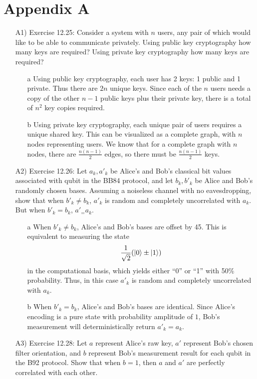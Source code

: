 \documentclass[conference]{IEEEtran}
\begin{document}
\section{Appendix A}
\begin{itemize}
\item [A1)] Exercise 12.25: Consider a system with $n$ users, any pair of which would like to be able to communicate privately. Using public key cryptography how many keys are required? Using private key cryptography how many keys are required?
  \begin{itemize}
  \item [a] Using public key cryptography, each user has 2 keys: 1 public and 1 private. Thus there are $2n$ unique keys. Since each of the $n$ users needs a copy of the other $n-1$ public keys plus their private key, there is a total of $n^2$ key copies required.
  \item [b] Using private key cryptography, each unique pair of users requires a unique shared key. This can be visualized as a complete graph, with $n$ nodes representing users. We know that for a complete graph with $n$ nodes, there are $\frac{n(n-1)}{2}$ edges, so there must be $\frac{n(n-1)}{2}$ keys.
  \end{itemize}
\item [A2)] Exercise 12.26: Let $a_k, a'_k$ be Alice's and Bob's classical bit values associated with qubit  in the BB84 protocol, and let $b_k, b'_k$ be Alice and Bob's randomly chosen bases. Assuming a noiseless channel with no eavesdropping, show that when $b'_k\neq b_k$, $a'_k$ is random and completely uncorrelated with $a_k$. But when $b'_k=b_k$, $a'_=a_k$.
  \begin{itemize}
  \item [a] When $b'_k\neq b_k$, Alice's and Bob's bases are offset by 45\degree. This is equivalent to measuring the state \[ \frac{1}{\sqrt{2}}(\left\vert{0}\right\rangle\pm\left\vert{1}\right\rangle) \]in the computational basis, which yields either ``0'' or ``1'' with 50\% probability. Thus, in this case $a'_k$ is random and completely uncorrelated with $a_k$.
  \item [b] When $b'_k= b_k$, Alice's and Bob's bases are identical. Since Alice's encoding is a pure state with probability amplitude of $1$, Bob's measurement will deterministically return $a'_k=a_k$.
  \end{itemize}
\item [A3)] Exercise 12.28: Let $a$ represent Alice's raw key, $a'$ represent Bob's chosen filter orientation, and $b$ represent Bob's measurement result for each qubit in the B92 protocol. Show that when $b=1$, then $a$ and $a'$ are perfectly correlated with each other.

\end{itemize}
\end{document}
